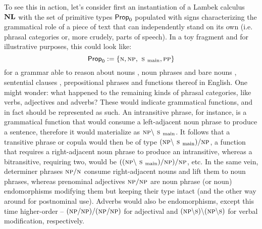To see this in action, let's consider first an instantiation of a Lambek calculus $\textbf{NL}$ with the set of primitive types $\mathsf{Prop}_0$ populated with signs characterizing the grammatical role of a piece of text that can independently stand on its own (i.e. phrasal categories or, more crudely, parts of speech).
In a toy fragment and for illustrative purposes, this could look like:
\[
	\propcon := \{\smalln, \smallnp, \smallsmain, \smallpp\}
\]
for a grammar able to reason about nouns \smalln, noun phrases and bare nouns \smallnp{}, sentential clauses \smallsmain{}, prepositional phrases \smallpp{} and functions thereof in English.
One might wonder: what happened to the remaining kinds of phrasal categories, like verbs, adjectives and adverbs?
These would indicate grammatical functions, and in fact should be represented as such.
An intransitive phrase, for instance, is a grammatical function that would consume a left-adjacent noun phrase to produce a sentence, therefore it would materialize as $\smallnp\divleft\smallsmain$.
It follows that a transitive phrase or copula would then be of type $(\smallnp\divleft\smallsmain)\divright\smallnp$, a function that requires a right-adjacent noun phrase to produce an intransitive, whereas a bitransitive, requiring two, would be $((\smallnp\divleft\smallsmain)\divright\smallnp)\divright\smallnp$, etc.
In the same vein, determiner phrases $\smallnp\divright\smalln$ consume right-adjacent nouns and lift them to noun phrases, whereas prenominal adjectives $\smallnp\divright\smallnp$  are noun phrase (or noun) endomorphisms modifying them but keeping their type intact (and the other way around for postnominal use).
Adverbs would also be endomorphisms, except this time higher-order -- \linebreak$(\smallnp\divright\smallnp)\divright(\smallnp\divright\smallnp)$ for adjectival and $(\smallnp\divleft\smalls)\divleft(\smallnp\divleft\smalls)$ for verbal modification, respectively.

